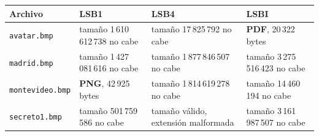 \begin{tabularx}{\textwidth}{@{}>{\raggedright\arraybackslash}p{2.6cm}>{\raggedright\arraybackslash}X>{\raggedright\arraybackslash}X>{\raggedright\arraybackslash}X@{}}
\toprule
Archivo & LSB1 & LSB4 & LSBI \\
\midrule
\texttt{avatar.bmp} & tamaño 1\,610\,612\,738 no cabe & tamaño 17\,825\,792 no cabe & \textbf{PDF}, 20\,322 bytes \\
\texttt{madrid.bmp} & tamaño 1\,427\,081\,616 no cabe & tamaño 1\,877\,846\,507 no cabe & tamaño 3\,275\,516\,423 no cabe \\
\texttt{montevideo.bmp} & \textbf{PNG}, 42\,925 bytes & tamaño 1\,814\,619\,278 no cabe & tamaño 14\,460\,194 no cabe \\
\texttt{secreto1.bmp} & tamaño 501\,759\,586 no cabe & tamaño válido, extensión malformada & tamaño 3\,161\,987\,507 no cabe \\
\bottomrule
\end{tabularx}
